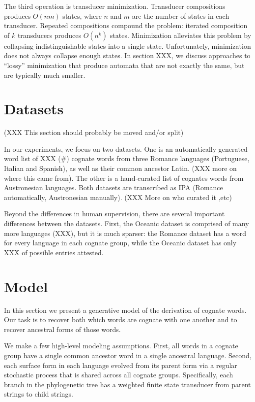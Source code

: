 \documentclass[11pt,a4paper]{article}
\begin{document}
The third operation is transducer minimization. Transducer compositions
produces $O(nm)$ states, where $n$ and $m$ are the number of states
in each transducer. Repeated compositions compound the problem:
iterated composition of $k$ transducers produces $O(n^k)$ states.
Minimization alleviates this problem by collapsing indistinguishable
states into a single state. Unfortunately, minimization does not
always collapse enough states. In section XXX, we discuss approaches
to ``lossy'' minimization that produce automata that are not exactly
the same, but are typically much smaller.

\section{Datasets}

(XXX This section should probably be moved and/or split)

In our experiments, we focus on two datasets. One is an automatically
generated word list of XXX (\#) cognate words from three Romance
languages (Portuguese, Italian and Spanish), as well as their common
ancestor Latin. (XXX more on where this came from). The other is a
hand-curated list of cognates words from Austronesian languages.
Both datasets are transcribed as IPA (Romance automatically,
Austronesian manually). (XXX More on who curated it ,etc)

Beyond the differences in human supervision, there are several
important differences between the datasets. First, the Oceanic
dataset is comprised of many more languages (XXX), but it is much
sparser: the Romance dataset has a word for every language in each
cognate group, while the Oceanic dataset has only XXX of possible
entries attested.

\section{Model}

In this section we present a generative model of the derivation of
cognate words. Our task is to recover both which words are cognate
with one another and to recover ancestral forms of those words.

We make a few high-level modeling assumptions. First, all words in
a cognate group have a single common ancestor word in a single
ancestral language. Second, each surface form in each language
evolved from its parent form via a regular stochastic process that
is shared across all cognate groups. Specifically, each branch in
the phylogenetic tree has a weighted finite state transducer from
parent strings to child strings.
\end{document}
